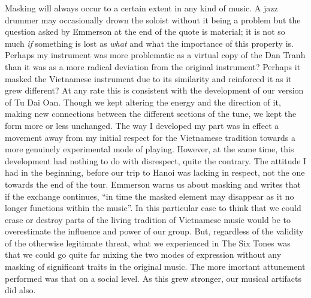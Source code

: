 \documentclass[a4paper]{article}
\begin{document}
Masking will always occur to a certain extent in any kind of music. A jazz drummer may occasionally drown the soloist without it being a problem but the question asked by Emmerson at the end of the quote is material; it is not so much \emph{if} something is lost as \emph{what} and what the importance of this property is. Perhaps my instrument was more problematic as a virtual copy of the Dan Tranh than it was as a more radical deviation from the original instrument? Perhaps it masked the Vietnamese instrument due to its similarity and reinforced it as it grew different? At any rate this is consistent with the development of our version of Tu Dai Oan. Though we kept altering the energy and the direction of it, making new connections between the different sections of the tune, we kept the form more or less unchanged. The way I developed my part was in effect a movement away from my initial respect for the Vietnamese tradition towards a more genuinely experimental mode of playing. However, at the same time, this development had nothing to do with disrespect, quite the contrary. The attitude I had in the beginning, before our trip to Hanoi was lacking in respect, not the one towards the end of the tour. Emmerson warns us about masking and writes that if the exchange continues, ``in time the masked element may disappear as it no longer functions within the music''. In this particular case to think that we could erase or destroy parts of the living tradition of Vietnamese music would be to overestimate the influence and power of our group. But, regardless of the validity of the otherwise legitimate threat, what we experienced in The Six Tones was that we could go quite far mixing the two modes of expression without any masking of significant traits in the original music. The more imortant attunement performed was that on a social level. As this grew stronger, our musical artifacts did also.
\end{document}
